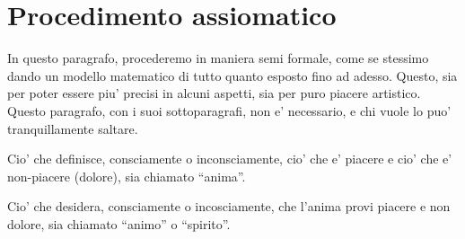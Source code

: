 %
%


%
%



\section{Procedimento assiomatico}
\label{procAx}

In questo paragrafo, procederemo in maniera semi formale, come se stessimo dando un modello matematico di tutto quanto esposto fino ad adesso. Questo, sia per poter essere piu' precisi in alcuni aspetti, sia per puro piacere artistico. Questo paragrafo, con i suoi sottoparagrafi, non e' necessario, e chi vuole lo puo' tranquillamente saltare.

Cio' che definisce, consciamente o inconsciamente, cio' che e' piacere e cio' che e' non-piacere (dolore), sia chiamato ``anima''.

Cio' che desidera, consciamente o incosciamente, che l'anima provi piacere e non dolore, sia chiamato ``animo'' o ``spirito''.

